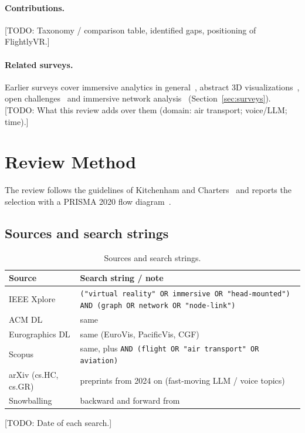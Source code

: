 \documentclass[11pt,a4paper]{article}
\newif\ifshowtodos \showtodostrue
\newcommand{\todo}[2][]{\ifshowtodos{\color{red}\footnotesize[TODO: #2]}\fi}
\newcommand{\system}{FlightlyVR}
\begin{document}
\paragraph{Contributions.} \todo{Taxonomy / comparison table, identified gaps, positioning
of \system.}

\paragraph{Related surveys.} Earlier surveys cover immersive analytics in
general~\cite{fonnet2021survey}, abstract 3D visualizations~\cite{kraus2022survey},
open challenges~\cite{ens2021grand} and immersive network analysis~\cite{joos2025survey}
(Section~\ref{sec:surveys}).
\todo{What this review adds over them (domain: air transport; voice/LLM; time).}

\section{Review Method}
\label{sec:method}

The review follows the guidelines of Kitchenham and Charters~\cite{kitchenham2007guidelines}
and reports the selection with a PRISMA 2020 flow diagram~\cite{page2021prisma}.

\subsection{Sources and search strings}

\begin{table}[h]
\centering
\small
\begin{tabularx}{\linewidth}{lY}
\toprule
Source & Search string / note \\
\midrule
IEEE Xplore      & \texttt{("virtual reality" OR immersive OR "head-mounted") AND (graph OR network OR "node-link")} \\
ACM DL           & same \\
Eurographics DL  & same (EuroVis, PacificVis, CGF) \\
Scopus           & same, plus \texttt{AND (flight OR "air transport" OR aviation)} \\
arXiv (cs.HC, cs.GR) & preprints from 2024 on (fast-moving LLM / voice topics) \\
Snowballing      & backward and forward from \cite{joos2025survey,kraus2022survey} \\
\bottomrule
\end{tabularx}
\caption{Sources and search strings.}
\todo{Date of each search.}
\label{tab:sources}
\end{table}
\end{document}

